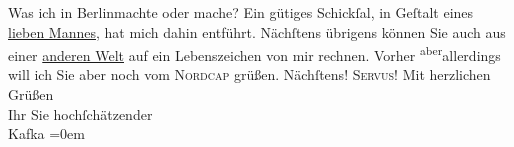 \begin{ledgroupsized}[t]{13cm}
           \pstart
           Was ich in Berlin\introOben{}machte oder\introOben{} mache? Ein gütiges Schickſal, in Geſtalt eines
                  \uline{lieben Mannes}, hat mich dahin  entführt. Nächſtens {\pb}übrigens können Sie auch aus einer \uline{anderen Welt} auf ein Lebenszeichen von mir rechnen.
               Vorher \substVorne{}\textsuperscript{aber}\substDazwischen{}allerdings\substHinten{} will ich Sie \introOben{}aber\introOben{} noch vom \textsc{Nordcap} grüßen. Nächſtens!\pend
           \pstart
           \textsc{Servus}! Mit herzlichen Grüßen{\\[\baselineskip]}Ihr Sie hochſchätzender{\\[\baselineskip]}\spacefill\mbox{Kafka}\pend
           \leftskip=0em{}
         
         \endnumbering{}\end{ledgroupsized}  \newcommand{\dateiname}{L00162}\newcommand{\titel}{Eduard Michael Kafka an Arthur Schnitzler, 24. 1. 1893}\newcommand{\editorInnen}{Martin Anton Müller und Gerd-Hermann Susen}
      
